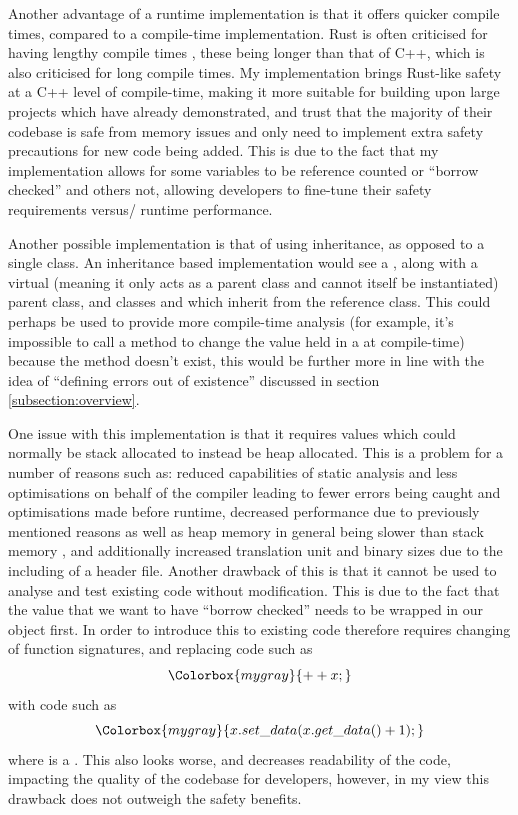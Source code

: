 \documentclass[a4paper]{article}
\begin{document}
Another advantage of a runtime implementation is that it offers quicker compile times, compared to a compile-time implementation. Rust is often criticised for having lengthy compile times \parencite{rust-compile-times}, these being longer than that of C++, which is also criticised for long compile times. My implementation brings Rust-like safety at a C++ level of compile-time, making it more suitable for building upon large projects which have already demonstrated, and trust that the majority of their codebase is safe from memory issues and only need to implement extra safety precautions for new code being added. This is due to the fact that my implementation allows for some variables to be reference counted or ``borrow checked'' and others not, allowing developers to fine-tune their safety requirements versus/ runtime performance.

Another possible implementation is that of using inheritance, as opposed to a single class. An inheritance based implementation would see a , along with a virtual (meaning it only acts as a parent class and cannot itself be instantiated)  parent class, and classes  and  which inherit from the reference class. This could perhaps be used to provide more compile-time analysis (for example, it's impossible to call a method to change the value held in a  at compile-time) because the method doesn't exist, this would be further more in line with the idea of ``defining errors out of existence'' discussed in section \ref{subsection:overview}.

One issue with this implementation is that it requires values which could normally be stack allocated to instead be heap allocated. This is a problem for a number of reasons such as: reduced capabilities of static analysis and less optimisations on behalf of the compiler leading to fewer errors being caught and optimisations made before runtime, decreased performance due to previously mentioned reasons as well as heap memory in general being slower than stack memory \parencite{stack-vs-heap}, and additionally increased translation unit and binary sizes due to the including of a header file.
Another drawback of this is that it cannot be used to analyse and test existing code without modification. This is due to the fact that the value that we want to have ``borrow checked'' needs to be wrapped in our  object first. In order to introduce this to existing code therefore requires changing of function signatures, and replacing code such as $$\Colorbox{mygray}{++x;}$$ with code such as $$\Colorbox{mygray}{x.set\_data(x.get\_data() + 1);}$$ where  is a . This also looks worse, and decreases readability of the code, impacting the quality of the codebase for developers, however, in my view this drawback does not outweigh the safety benefits.
\end{document}
